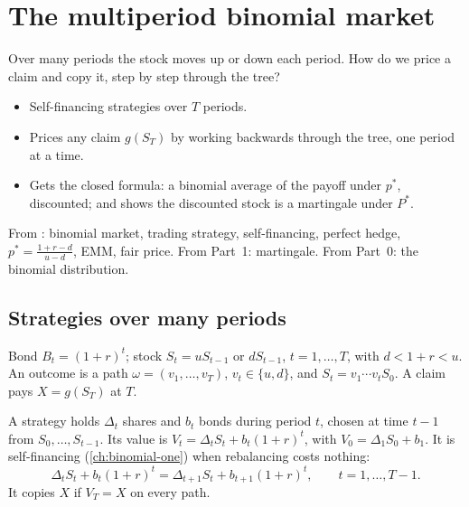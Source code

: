 \chapter{The multiperiod binomial market}
\label{ch:binomial-multi}

\begin{question}
Over many periods the stock moves up or down each period. How do we price a claim and copy it, step by step through the tree?
\end{question}

\begin{whatfor}
\begin{itemize}
  \item Self-financing strategies over $T$ periods.
  \item Prices any claim $g(S_T)$ by working backwards through the tree, one period at a time.
  \item Gets the closed formula: a binomial average of the payoff under $p^*$, discounted; and shows the discounted stock is a martingale under $P^*$.
\end{itemize}
\end{whatfor}

\begin{prereq}
From : binomial market, trading strategy, self-financing, perfect hedge, $p^*=\frac{1+r-d}{u-d}$, EMM, fair price. From Part~1: martingale. From Part~0: the binomial distribution.
\end{prereq}

\section{Strategies over many periods}

\begin{setup}
Bond $B_t=(1+r)^t$; stock $S_t=uS_{t-1}$ or $dS_{t-1}$, $t=1,\dots,T$, with $d<1+r<u$. An outcome is a path $\omega=(v_1,\dots,v_T)$, $v_t\in\{u,d\}$, and $S_t=v_1\cdots v_tS_0$. A claim pays $X=g(S_T)$ at $T$.
\end{setup}

A strategy holds $\Delta_t$ shares and $b_t$ bonds during period $t$, chosen at time $t-1$ from $S_0,\dots,S_{t-1}$. Its value is $V_t=\Delta_tS_t+b_t(1+r)^t$, with $V_0=\Delta_1S_0+b_1$. It is self-financing (\cref{ch:binomial-one}) when rebalancing costs nothing:
\[
  \Delta_tS_t+b_t(1+r)^t=\Delta_{t+1}S_t+b_{t+1}(1+r)^t,\qquad t=1,\dots,T-1 .
\]
It copies $X$ if $V_T=X$ on every path.

